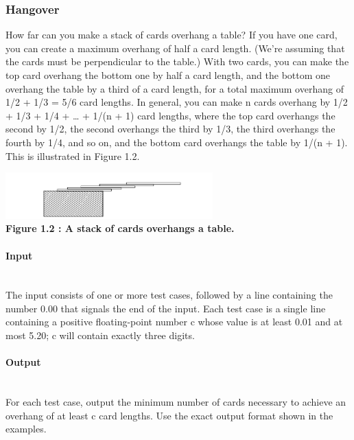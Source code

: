 \documentclass{article}
\begin{document}


\subsubsection{Hangover}

How far can you make a stack of cards overhang a table? If you have one card, you can create a
maximum overhang of half a card length. (We’re assuming that the cards must be perpendicular to the table.) With two cards, you can make the top card overhang the bottom one by half a
card length, and the bottom one overhang the table by a third of a card length, for a total maximum overhang of 1/2 + 1/3 = 5/6 card lengths. In general, you can make n cards overhang by
1/2 + 1/3 + 1/4 + … + 1/(n + 1) card lengths, where the top card overhangs the second by 1/2, the
second overhangs the third by 1/3, the third overhangs the fourth by 1/4, and so on, and the bottom card overhangs the table by 1/(n + 1). This is illustrated in Figure 1.2.

\begin{center}
    \includegraphics[width=0.6\textwidth]{Figures/04.png} \\
    \textbf{Figure 1.2 : A stack of cards overhangs a table.}
\end{center}

\paragraph{Input} \mbox{} \\
The input consists of one or more test cases, followed by a line containing the number 0.00 that
signals the end of the input. Each test case is a single line containing a positive floating-point number c whose value is at least 0.01 and at most 5.20; c will contain exactly three digits.

\paragraph{Output}\mbox{} \\
For each test case, output the minimum number of cards necessary to achieve an overhang of at
least c card lengths. Use the exact output format shown in the examples.
\end{document}
